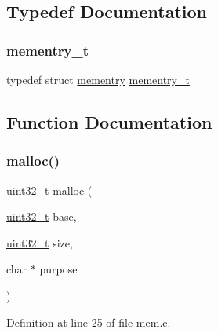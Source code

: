 \subsection{Typedef Documentation}
\mbox{\label{a00110_a876b6ee19692762a87e4673911f9b8da_a876b6ee19692762a87e4673911f9b8da}} 
\subsubsection{\texorpdfstring{mementry\+\_\+t}{mementry\_t}}
{\footnotesize\ttfamily typedef struct \hyperlink{a00164}{mementry}  \hyperlink{a00110_a876b6ee19692762a87e4673911f9b8da_a876b6ee19692762a87e4673911f9b8da}{mementry\+\_\+t}}



\subsection{Function Documentation}
\mbox{\label{a00110_a9087e3504e5973deee6f3561705978c7_a9087e3504e5973deee6f3561705978c7}} 
\subsubsection{\texorpdfstring{malloc()}{malloc()}}
{\footnotesize\ttfamily \hyperlink{a00095_a435d1572bf3f880d55459d9805097f62_a435d1572bf3f880d55459d9805097f62}{uint32\+\_\+t} malloc (\begin{DoxyParamCaption}\item[{\hyperlink{a00095_a435d1572bf3f880d55459d9805097f62_a435d1572bf3f880d55459d9805097f62}{uint32\+\_\+t}}]{base,  }\item[{\hyperlink{a00095_a435d1572bf3f880d55459d9805097f62_a435d1572bf3f880d55459d9805097f62}{uint32\+\_\+t}}]{size,  }\item[{char $\ast$}]{purpose }\end{DoxyParamCaption})}



Definition at line 25 of file mem.\+c.


